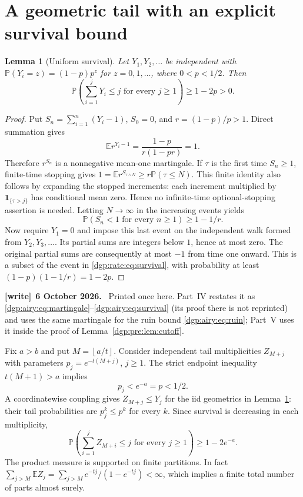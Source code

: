 \documentclass[11pt,letterpaper]{article}
\numberwithin{equation}{section}
\newtheorem{lemma}[theorem]{Lemma}
\theoremstyle{remark}\newtheorem{remark}[theorem]{Remark}
\newcommand{\PP}{\mathbb P}
\newcommand{\EE}{\mathbb E}
\newcommand{\floor}[1]{\left\lfloor #1\right\rfloor}
\newenvironment{writenote}[1][]{\par\smallskip\begingroup\small
 \noindent\textbf{[write]}\if\relax\detokenize{#1}\relax\else~\textbf{#1.}\fi\ }%
 {\par\endgroup\smallskip}
\begin{document}
\section{A geometric tail with an explicit survival bound}\label{dgp:rate:sec:tail}
\begin{lemma}[Uniform survival]\label{dgp:rate:lem:survival}
Let $Y_1,Y_2,\ldots$ be independent with
$\PP(Y_i=z)=(1-p)p^z$ for $z=0,1,\ldots$, where $0<p<1/2$. Then
\begin{equation}\label{dgp:rate:eq:survival}
 \PP\left(\sum_{i=1}^jY_i\leq j\text{ for every }j\geq1\right)
 \geq1-2p>0.
\end{equation}
\end{lemma}
\begin{proof}
Put $S_n=\sum_{i=1}^n(Y_i-1)$, $S_0=0$, and $r=(1-p)/p>1$. Direct
summation gives
\[
 \EE r^{Y_i-1}=\frac{1-p}{r(1-pr)}=1.
\]
Therefore $r^{S_n}$ is a nonnegative mean-one martingale. If $\tau$ is
the first time $S_n\geq1$, finite-time stopping gives
$1=\EE r^{S_{\tau\wedge N}}\geq r\PP(\tau\leq N)$.
This finite identity also follows by expanding the stopped increments:
each increment multiplied by $\mathbf1_{\{\tau>j\}}$ has conditional
mean zero. Hence no infinite-time optional-stopping assertion is needed.
Letting $N\to\infty$ in the increasing events yields
\[
 \PP(S_n<1\text{ for every }n\geq1)\geq1-1/r.
\]
Now require $Y_1=0$ and impose this last event on the independent walk
formed from $Y_2,Y_3,\ldots$. Its partial sums are integers below $1$,
hence at most zero. The original partial sums are consequently at most
$-1$ from time one onward. This is a subset of the event in
\eqref{dgp:rate:eq:survival}, with probability at least
$(1-p)(1-1/r)=1-2p$.
\end{proof}
\begin{writenote}[6 October 2026]
Printed once here. Part~IV restates it as \eqref{dgp:airy:eq:martingale}--\eqref{dgp:airy:eq:survival} (its proof there is not reprinted) and uses the same martingale for the ruin bound \eqref{dgp:airy:eq:ruin}; Part~V uses it inside the proof of Lemma~\ref{dgp:pre:lem:cutoff}.
\end{writenote}

Fix $a>b$ and put $M=\floor{a/t}$. Consider independent tail
multiplicities $Z_{M+j}$ with parameters
$p_j=e^{-t(M+j)}$, $j\geq1$. The strict endpoint inequality
$t(M+1)>a$ implies
\[
 p_j<e^{-a}=p<1/2.
\]
A coordinatewise coupling gives $Z_{M+j}\leq Y_j$ for the iid geometrics
in Lemma~\ref{dgp:rate:lem:survival}: their tail probabilities are $p_j^k\leq p^k$
for every $k$. Since survival is decreasing in each multiplicity,
\begin{equation}\label{dgp:rate:eq:tailprob}
 \PP\left(\sum_{i=1}^j Z_{M+i}\leq j\text{ for every }j\geq1\right)
 \geq1-2e^{-a}.
\end{equation}
The product measure is supported on finite partitions. In fact
$\sum_{j>M}\EE Z_j=\sum_{j>M}e^{-tj}/(1-e^{-tj})<\infty$, which implies
a finite total number of parts almost surely.
\end{document}
